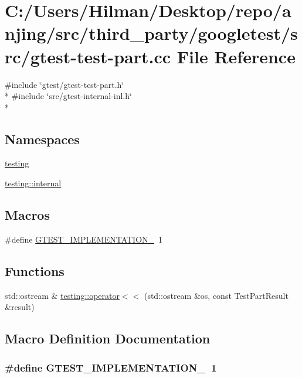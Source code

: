\hypertarget{gtest-test-part_8cc}{}\section{C\+:/\+Users/\+Hilman/\+Desktop/repo/anjing/src/third\+\_\+party/googletest/src/gtest-\/test-\/part.cc File Reference}
\label{gtest-test-part_8cc}
{\ttfamily \#include \char`\"{}gtest/gtest-\/test-\/part.\+h\char`\"{}}\\*
{\ttfamily \#include \char`\"{}src/gtest-\/internal-\/inl.\+h\char`\"{}}\\*
\subsection*{Namespaces}
\begin{DoxyCompactItemize}
\item 
 \hyperlink{namespacetesting}{testing}
\item 
 \hyperlink{namespacetesting_1_1internal}{testing\+::internal}
\end{DoxyCompactItemize}
\subsection*{Macros}
\begin{DoxyCompactItemize}
\item 
\#define \hyperlink{gtest-test-part_8cc_a83bd232fd1077579fada92c31bb7469f}{G\+T\+E\+S\+T\+\_\+\+I\+M\+P\+L\+E\+M\+E\+N\+T\+A\+T\+I\+O\+N\+\_\+}~1
\end{DoxyCompactItemize}
\subsection*{Functions}
\begin{DoxyCompactItemize}
\item 
std\+::ostream \& \hyperlink{namespacetesting_a7c88897836b9f492190fb2b9dfa3a327}{testing\+::operator$<$$<$} (std\+::ostream \&os, const Test\+Part\+Result \&result)
\end{DoxyCompactItemize}


\subsection{Macro Definition Documentation}
\hypertarget{gtest-test-part_8cc_a83bd232fd1077579fada92c31bb7469f}{}
\subsubsection[{G\+T\+E\+S\+T\+\_\+\+I\+M\+P\+L\+E\+M\+E\+N\+T\+A\+T\+I\+O\+N\+\_\+}]{\setlength{\rightskip}{0pt plus 5cm}\#define G\+T\+E\+S\+T\+\_\+\+I\+M\+P\+L\+E\+M\+E\+N\+T\+A\+T\+I\+O\+N\+\_\+~1}\label{gtest-test-part_8cc_a83bd232fd1077579fada92c31bb7469f}
